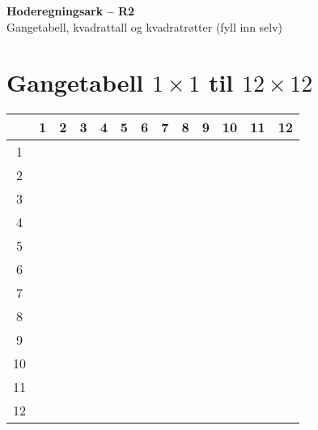 \documentclass[11pt]{article}
\begin{document}
\begin{center}
  {\LARGE \textbf{Hoderegningsark – R2}}\\[2mm]
  {\large Gangetabell, kvadrattall og kvadratrøtter (fyll inn selv)}
\end{center}
\vspace{4mm}

\section*{Gangetabell $1\times 1$ til $12\times 12$}
\setlength{\tabcolsep}{6pt}
\renewcommand{\arraystretch}{1.3}
\small
\begin{center}
\begin{tabular}{c|*{12}{c}}
 & 1 & 2 & 3 & 4 & 5 & 6 & 7 & 8 & 9 & 10 & 11 & 12 \\
\hline
1  & & & & & & & & & & & & \\
2  & & & & & & & & & & & & \\
3  & & & & & & & & & & & & \\
4  & & & & & & & & & & & & \\
5  & & & & & & & & & & & & \\
6  & & & & & & & & & & & & \\
7  & & & & & & & & & & & & \\
8  & & & & & & & & & & & & \\
9  & & & & & & & & & & & & \\
10 & & & & & & & & & & & & \\
11 & & & & & & & & & & & & \\
12 & & & & & & & & & & & & \\
\end{tabular}
\end{center}

\end{document}
